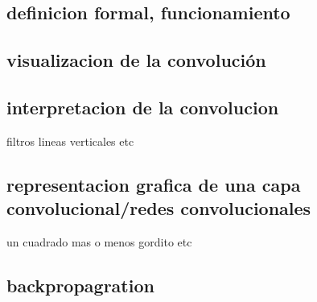 \documentclass{article}
\begin{document}
\subsection{definicion formal, funcionamiento}

\subsection{visualizacion de la convolución}

\subsection{interpretacion de la convolucion}
filtros lineas verticales etc

\subsection{representacion grafica de una capa convolucional/redes convolucionales}
un cuadrado mas o menos gordito etc

\subsection{backpropagration}
\end{document}
